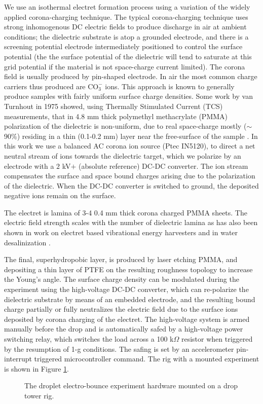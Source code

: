 \documentclass[12pt,a4paper,oneside]{book}
\begin{document}
We use an isothermal electret formation process using a variation of the widely applied corona-charging technique. The typical corona-charging technique uses strong inhomogenous DC electric fields to produce discharge in air at ambient conditions; the dielectric substrate is atop a grounded electrode, and there is a screening potential electrode intermediately positioned to control the surface potential (the the surface potential of the dielectric will tend to saturate at this grid potential if the material is not space-charge current limited). The corona field is usually produced by pin-shaped electrode. In air the most common charge carriers thus produced are $\mbox{CO}_3^-$ ions. This approach is known to generally produce samples with fairly uniform surface charge densities. Some work by van Turnhout in 1975 showed, using Thermally Stimulated Current (TCS) measurements, that in 4.8 mm thick polymethyl methacrylate (PMMA) polarization of the dielectric is non-uniform, due to real space-charge mostly ($\sim$90\%) residing in a thin (0.1-0.2 mm) layer near the free-surface of the sample \cite{van_turnhout_thermally_1975}. In this work we use a balanced AC corona ion source (Ptec IN5120), to direct a net neutral stream of ions towards the dielectric target, which we polarize by an electrode with a $2$ kV$+$ (absolute reference) DC-DC converter. The ion stream compensates the surface and space bound charges arising due to the polarization of the dielectric. When the DC-DC converter is switched to ground, the deposited negative ions remain on the surface. 

The electret is lamina of 3-4 0.4 mm thick corona charged PMMA sheets. The electric field strength scales with the number of dielectric lamina as has also been shown in work on electret based vibrational energy harvesters \cite{wada_stacking_2012} and in water desalinization \cite{ni_desalination_2005}. 

The final, superhydropobic layer, is produced by laser etching PMMA, and depositing a thin layer of PTFE on the resulting roughness topology to increase the Young's angle. The surface charge density can be modulated during the experiment using the high-voltage DC-DC converter, which can re-polarize the dielectric substrate by means of an embedded electrode, and the resulting bound charge partially or fully neutralizes the electric field due to the surface ions deposited by corona charging of the electret. The high-voltage system is armed manually before the drop and is automatically safed by a high-voltage power switching relay, which switches the load across a 100 k$\Omega$ resistor when triggered by the resumption of 1-g conditions. The safing is set by an accelerometer pin-interrupt triggered microcontroller command. The rig with a mounted experiment is shown in Figure \ref{fig:rig}. 
\begin{figure}
    \centering
    \def\svgwidth{\columnwidth}
    
    \caption{The droplet electro-bounce experiment hardware mounted on a drop tower rig.\label{fig:rig}}
\end{figure}
\end{document}
